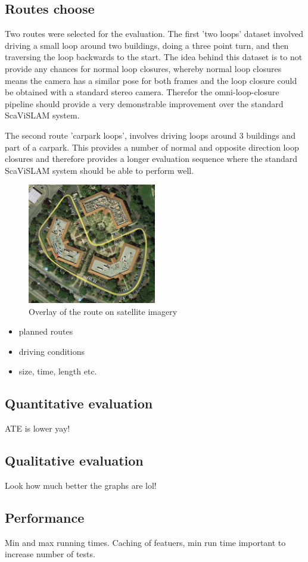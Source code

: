 \subsection{Routes choose}

Two routes were selected for the evaluation.  The first 'two loops' dataset involved driving a small loop around two buildings, doing a three point turn, and then traversing the loop backwards to the start.  The idea behind this dataset is to not provide any chances for normal loop closures, whereby normal loop closures means the camera has a similar pose for both frames and the loop closure could be obtained with a standard stereo camera.  Therefor the omni-loop-closure pipeline should provide a very demonstrable improvement over the standard ScaViSLAM system.

The second route 'carpark loops', involves driving loops around 3 buildings and part of a carpark.  This provides a number of normal and opposite direction loop closures and therefore provides a longer evaluation sequence where the standard ScaViSLAM system should be able to perform well.

\begin{figure}[H]
  \centering
    \includegraphics[width=0.5\textwidth]{chapters/images/two_loops_overlay}
  \caption{Overlay of the route on satellite imagery}
\end{figure}

\begin{itemize}
\item planned routes
\item driving conditions
\item size, time, length etc.
\end{itemize}

\subsection{Quantitative evaluation}

ATE is lower yay!

\subsection{Qualitative evaluation}

Look how much better the graphs are lol!

\subsection{Performance}

Min and max running times.  Caching of featuers, min run time important to increase number of tests.